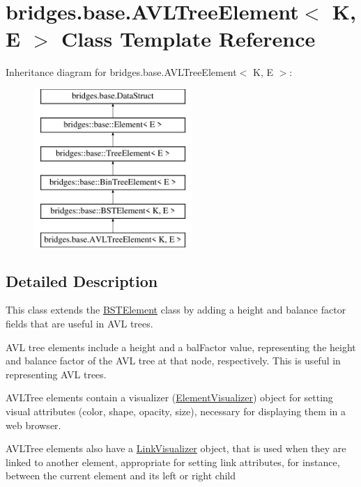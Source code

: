 \hypertarget{classbridges_1_1base_1_1_a_v_l_tree_element}{}\section{bridges.\+base.\+A\+V\+L\+Tree\+Element$<$ K, E $>$ Class Template Reference}
\label{classbridges_1_1base_1_1_a_v_l_tree_element}
Inheritance diagram for bridges.\+base.\+A\+V\+L\+Tree\+Element$<$ K, E $>$\+:\begin{figure}[H]
\begin{center}
\leavevmode
\includegraphics[height=6.000000cm]{classbridges_1_1base_1_1_a_v_l_tree_element}
\end{center}
\end{figure}


\subsection{Detailed Description}
This class extends the \hyperlink{classbridges_1_1base_1_1_b_s_t_element}{B\+S\+T\+Element} class by adding a height and balance factor fields that are useful in A\+VL trees. 

A\+VL tree elements include a \textquotesingle{}height\textquotesingle{} and a \textquotesingle{}bal\+Factor\textquotesingle{} value, representing the height and balance factor of the A\+VL tree at that node, respectively. This is useful in representing A\+VL trees.

A\+V\+L\+Tree elements contain a visualizer (\hyperlink{classbridges_1_1base_1_1_element_visualizer}{Element\+Visualizer}) object for setting visual attributes (color, shape, opacity, size), necessary for displaying them in a web browser.

A\+V\+L\+Tree elements also have a \hyperlink{classbridges_1_1base_1_1_link_visualizer}{Link\+Visualizer} object, that is used when they are linked to another element, appropriate for setting link attributes, for instance, between the current element and its left or right child

